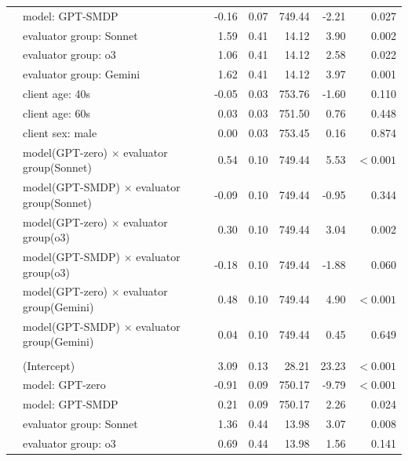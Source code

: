 \documentclass{wiley-article}
\begin{document}
{\begin{longtable}{@{}l p{} rrrrr@{}}
    & model: GPT-SMDP                                         &-0.16 & 0.07 & 749.44 &  -2.21 & 0.027 \\
    & evaluator group: Sonnet                                 & 1.59 & 0.41 &  14.12 &   3.90 & 0.002 \\
    & evaluator group: o3                                     & 1.06 & 0.41 &  14.12 &   2.58 & 0.022 \\
    & evaluator group: Gemini                                 & 1.62 & 0.41 &  14.12 &   3.97 & 0.001 \\
    & client age: 40s                                         &-0.05 & 0.03 & 753.76 &  -1.60 & 0.110 \\
    & client age: 60s                                         & 0.03 & 0.03 & 751.50 &   0.76 & 0.448 \\
    & client sex: male                                        & 0.00 & 0.03 & 753.45 &   0.16 & 0.874 \\
    & model(GPT-zero) $\times$ evaluator group(Sonnet)        & 0.54 & 0.10 & 749.44 &   5.53 & $<\!0.001$ \\
    & model(GPT-SMDP) $\times$ evaluator group(Sonnet)        &-0.09 & 0.10 & 749.44 &  -0.95 & 0.344 \\
    & model(GPT-zero) $\times$ evaluator group(o3)            & 0.30 & 0.10 & 749.44 &   3.04 & 0.002 \\
    & model(GPT-SMDP) $\times$ evaluator group(o3)            &-0.18 & 0.10 & 749.44 &  -1.88 & 0.060 \\
    & model(GPT-zero) $\times$ evaluator group(Gemini)        & 0.48 & 0.10 & 749.44 &   4.90 & $<\!0.001$ \\
    & model(GPT-SMDP) $\times$ evaluator group(Gemini)        & 0.04 & 0.10 & 749.44 &   0.45 & 0.649 \\
  \addlinespace
  \multicolumn{7}{l}{\textbf{PAR}}\\
    & (Intercept)                                             & 3.09 & 0.13 &  28.21 &  23.23 & $<\!0.001$ \\
    & model: GPT-zero                                         &-0.91 & 0.09 & 750.17 &  -9.79 & $<\!0.001$ \\
    & model: GPT-SMDP                                         & 0.21 & 0.09 & 750.17 &   2.26 & 0.024 \\
    & evaluator group: Sonnet                                 & 1.36 & 0.44 &  13.98 &   3.07 & 0.008 \\
    & evaluator group: o3                                     & 0.69 & 0.44 &  13.98 &   1.56 & 0.141 \\

\end{longtable}}
\end{document}
